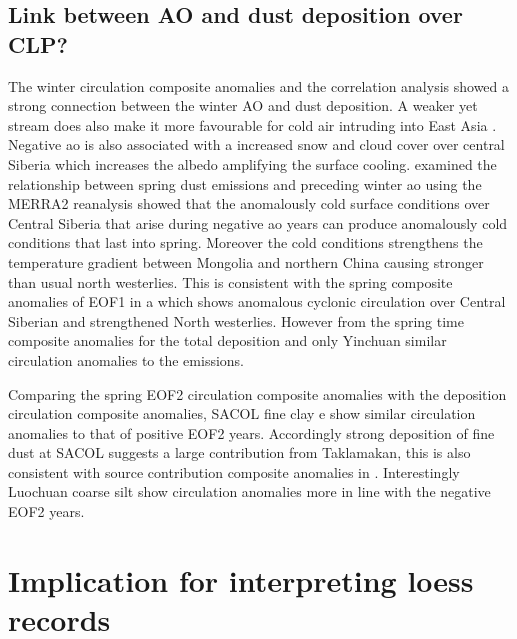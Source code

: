 \subsection{Link between AO and dust deposition over CLP?}
The winter circulation composite anomalies and the correlation analysis showed a strong connection between the winter AO and dust deposition. 
A weaker yet stream does also make it more favourable for cold air intruding into East Asia \parencite{he2017impact}. 
Negative \acrshort{ao} is also associated with a increased snow and cloud cover over central Siberia which increases the albedo amplifying the surface cooling. 
\textcite{liu2018influence} examined the relationship between spring dust emissions and preceding winter \acrshort{ao} using the MERRA2 reanalysis showed that the anomalously cold surface conditions over Central Siberia that arise during negative \acrshort{ao} years can produce anomalously cold conditions that last into spring. 
Moreover the cold conditions strengthens the temperature gradient between Mongolia and northern China causing stronger than usual north westerlies. 
This is consistent with the spring composite anomalies of EOF1 in a which shows anomalous cyclonic circulation over Central Siberian and strengthened North westerlies. 
However from the spring time composite anomalies for the total deposition   and  only Yinchuan similar circulation anomalies to the emissions. 

Comparing the spring EOF2 circulation composite anomalies with the deposition circulation composite anomalies, SACOL fine clay e show similar circulation anomalies to that of positive EOF2 years. Accordingly strong deposition of fine dust at SACOL suggests a large contribution from Taklamakan, this is also consistent with source contribution composite anomalies in . Interestingly Luochuan coarse silt show circulation anomalies more in line with the negative EOF2 years.    

\section{Implication for interpreting loess records}

